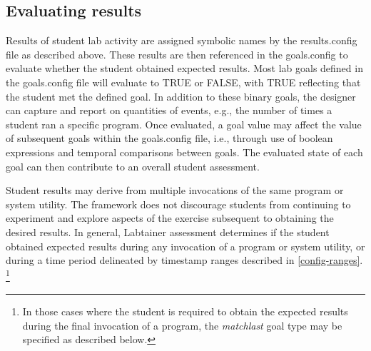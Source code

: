 \documentclass[12pt]{article}
\begin{document}
\subsection{Evaluating results}
\label{goals.config}
Results of student lab activity are assigned symbolic names by the results.config file
as described above.  These results are then referenced in the goals.config to evaluate whether
the student obtained expected results.  Most lab goals defined in the goals.config file
will evaluate to TRUE or FALSE, with TRUE reflecting that the student met the defined goal.
In addition to these binary goals, the designer can capture and report on quantities of events,
e.g., the number of times a student ran a specific program.
Once evaluated, a goal value may affect the value of subsequent goals within the goals.config file, 
i.e., through use of boolean expressions and temporal comparisons between goals.  The evaluated
state of each goal can then contribute to an overall student assessment.

Student results may derive from multiple invocations of the same program or system utility.  
The framework does not discourage students from continuing to experiment and explore aspects of the 
exercise subsequent to obtaining the desired results.  In general, Labtainer assessment determines if the student
obtained expected results during any invocation of a program or system utility, or during a time period
delineated by timestamp ranges described in \ref{config-ranges}.  \footnote{In those cases 
where the student is required to obtain the expected results during the final invocation of a program, 
the \textit{matchlast} goal type may be specified as described below.}
\end{document}
